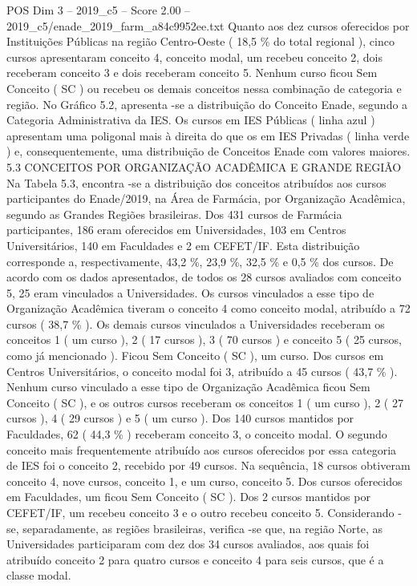 \begin{textsample}{POS Dim 3 – 2019\_c5 – Score 2.00 – 2019\_c5/enade\_2019\_farm\_a84c9952ee.txt}
Quanto aos dez cursos oferecidos por Instituições Públicas na região Centro-Oeste ( 18,5 \% do total regional ), cinco cursos apresentaram conceito 4, conceito modal, um recebeu conceito 2, dois receberam conceito 3 e dois receberam conceito 5.
Nenhum curso ficou Sem Conceito ( SC ) ou recebeu os demais conceitos nessa combinação de categoria e região.
No Gráfico 5.2, apresenta -se a distribuição do Conceito Enade, segundo a Categoria Administrativa da IES.
Os cursos em IES Públicas ( linha azul ) apresentam uma poligonal mais à direita do que os em IES Privadas ( linha verde ) e, consequentemente, uma distribuição de Conceitos Enade com valores maiores. 5.3 CONCEITOS POR ORGANIZAÇÃO ACADÊMICA E GRANDE REGIÃO Na Tabela 5.3, encontra -se a distribuição dos conceitos atribuídos aos cursos participantes do Enade/2019, na Área de Farmácia, por Organização Acadêmica, segundo as Grandes Regiões brasileiras.
Dos 431 cursos de Farmácia participantes, 186 eram oferecidos em Universidades, 103 em Centros Universitários, 140 em Faculdades e 2 em CEFET/IF.
Esta distribuição corresponde a, respectivamente, 43,2 \%, 23,9 \%, 32,5 \% e 0,5 \% dos cursos.
De acordo com os dados apresentados, de todos os 28 cursos avaliados com conceito 5, 25 eram vinculados a Universidades.
Os cursos vinculados a esse tipo de Organização Acadêmica tiveram o conceito 4 como conceito modal, atribuído a 72 cursos ( 38,7 \% ).
Os demais cursos vinculados a Universidades receberam os conceitos 1 ( um curso ), 2 ( 17 cursos ), 3 ( 70 cursos ) e conceito 5 ( 25 cursos, como já mencionado ).
Ficou Sem Conceito ( SC ), um curso.
Dos cursos em Centros Universitários, o conceito modal foi 3, atribuído a 45 cursos ( 43,7 \% ).
Nenhum curso vinculado a esse tipo de Organização Acadêmica ficou Sem Conceito ( SC ), e os outros cursos receberam os conceitos 1 ( um curso ), 2 ( 27 cursos ), 4 ( 29 cursos ) e 5 ( um curso ).
Dos 140 cursos mantidos por Faculdades, 62 ( 44,3 \% ) receberam conceito 3, o conceito modal.
O segundo conceito mais frequentemente atribuído aos cursos oferecidos por essa categoria de IES foi o conceito 2, recebido por 49 cursos.
Na sequência, 18 cursos obtiveram conceito 4, nove cursos, conceito 1, e um curso, conceito 5.
Dos cursos oferecidos em Faculdades, um ficou Sem Conceito ( SC ).
Dos 2 cursos mantidos por CEFET/IF, um recebeu conceito 3 e o outro recebeu conceito 5.
Considerando -se, separadamente, as regiões brasileiras, verifica -se que, na região Norte, as Universidades participaram com dez dos 34 cursos avaliados, aos quais foi atribuído conceito 2 para quatro cursos e conceito 4 para seis cursos, que é a classe modal.

\end{textsample}
